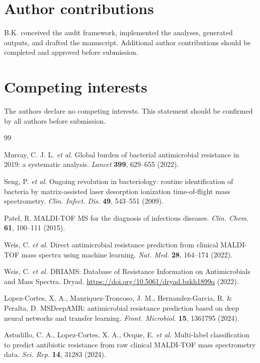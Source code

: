 \documentclass[11pt]{article}
\begin{document}
\section*{Author contributions}

B.K. conceived the audit framework, implemented the analyses, generated outputs, and drafted the manuscript. Additional author contributions should be completed and approved before submission.

\section*{Competing interests}

The authors declare no competing interests. This statement should be confirmed by all authors before submission.

\begin{thebibliography}{99}

Murray, C. J. L. \textit{et al.} Global burden of bacterial antimicrobial resistance in 2019: a systematic analysis. \textit{Lancet} \textbf{399}, 629--655 (2022).

Seng, P. \textit{et al.} Ongoing revolution in bacteriology: routine identification of bacteria by matrix-assisted laser desorption ionization time-of-flight mass spectrometry. \textit{Clin. Infect. Dis.} \textbf{49}, 543--551 (2009).

Patel, R. MALDI-TOF MS for the diagnosis of infectious diseases. \textit{Clin. Chem.} \textbf{61}, 100--111 (2015).

Weis, C. \textit{et al.} Direct antimicrobial resistance prediction from clinical MALDI-TOF mass spectra using machine learning. \textit{Nat. Med.} \textbf{28}, 164--174 (2022).

Weis, C. \textit{et al.} DRIAMS: Database of Resistance Information on Antimicrobials and Mass Spectra. Dryad. \url{https://doi.org/10.5061/dryad.bzkh1899q} (2022).

Lopez-Cortes, X. A., Manriquez-Troncoso, J. M., Hernandez-Garcia, R. \& Peralta, D. MSDeepAMR: antimicrobial resistance prediction based on deep neural networks and transfer learning. \textit{Front. Microbiol.} \textbf{15}, 1361795 (2024).

Astudillo, C. A., Lopez-Cortes, X. A., Ocque, E. \textit{et al.} Multi-label classification to predict antibiotic resistance from raw clinical MALDI-TOF mass spectrometry data. \textit{Sci. Rep.} \textbf{14}, 31283 (2024).


\end{thebibliography}
\end{document}
